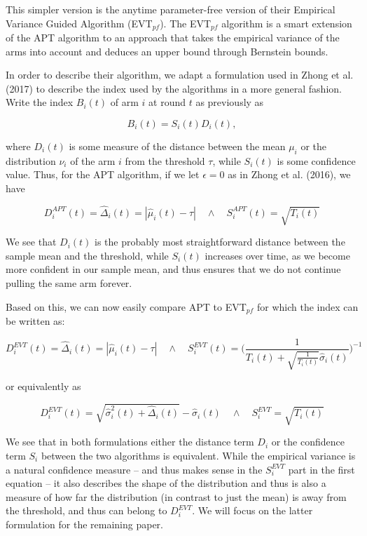 \documentclass[12pt,]{article}
\begin{document}
This simpler version is the anytime parameter-free version of their
Empirical Variance Guided Algorithm (EVT\(_{pf}\)). The EVT\(_{pf}\)
algorithm is a smart extension of the APT algorithm to an approach that
takes the empirical variance of the arms into account and deduces an
upper bound through Bernstein bounds.

In order to describe their algorithm, we adapt a formulation used in
Zhong et al. (2017) to describe the index used by the algorithms in a
more general fashion. Write the index \(B_i(t)\) of arm \(i\) at round
\(t\) as previously as

\[
B_i(t) = S_i(t) D_i(t),
\]

where \(D_i(t)\) is some measure of the distance between the mean
\(\mu_i\) or the distribution \(\nu_i\) of the arm \(i\) from the
threshold \(\tau\), while \(S_i(t)\) is some confidence value. Thus, for
the APT algorithm, if we let \(\epsilon = 0\) as in Zhong et al. (2016),
we have

\[
D_i^{APT}(t) = \hat{\Delta}_i(t) = |\hat{\mu}_i(t) - \tau| \quad \land \quad S_i^{APT}(t) = \sqrt{T_i(t)}
\]

We see that \(D_i(t)\) is the probably most straightforward distance
between the sample mean and the threshold, while \(S_i(t)\) increases
over time, as we become more confident in our sample mean, and thus
ensures that we do not continue pulling the same arm forever.

Based on this, we can now easily compare APT to EVT\(_{pf}\) for which
the index can be written as:

\[
D_i^{EVT}(t) = \hat{\Delta}_i(t) = |\hat{\mu}_i(t) - \tau| \quad \land \quad S_i^{EVT}(t) = \Big(\frac{1}{T_i(t) + \sqrt{\frac{1}{T_i(t)}}\hat{\sigma}_{i}(t)}\Big)^{-1}
\]

or equivalently as

\[
D_i^{EVT}(t) = \sqrt{\hat{\sigma}^2_{i}(t) + \hat{\Delta}_i(t)} - \hat{\sigma}_i(t) \quad \land \quad S_i^{EVT} = \sqrt{T_i(t)}
\]

We see that in both formulations either the distance term \(D_i\) or the
confidence term \(S_i\) between the two algorithms is equivalent. While
the empirical variance is a natural confidence measure -- and thus makes
sense in the \(S_i^{EVT}\) part in the first equation -- it also
describes the shape of the distribution and thus is also a measure of
how far the distribution (in contrast to just the mean) is away from the
threshold, and thus can belong to \(D_i^{EVT}\). We will focus on the
latter formulation for the remaining paper.
\end{document}
